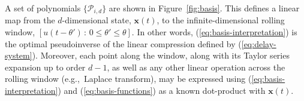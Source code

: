 \documentclass[12pt, a4paper]{article}
\renewcommand{\vec}{\mathbf}  %
\begin{document}
A set of polynomials $\{ \mathcal{P}_{i, d} \}$ are shown in Figure~\ref{fig:basis}.
This defines a linear map from the $d$-dimensional state, $\vec{x}(t)$, to the infinite-dimensional rolling window, $[ u(t - \theta') \,:\, 0 \le \theta' \le \theta ]$.
In other words, (\ref{eq:basis-interpretation}) is the optimal pseudoinverse of the linear compression defined by (\ref{eq:delay-system}).
Moreover, each point along the window, along with its Taylor series expansion up to order $d-1$, as well as any other linear operation across the rolling window (e.g.,~Laplace transform), may be expressed using (\ref{eq:basis-interpretation}) and (\ref{eq:basis-functions}) as a known dot-product with $\vec{x}(t)$.
\end{document}
